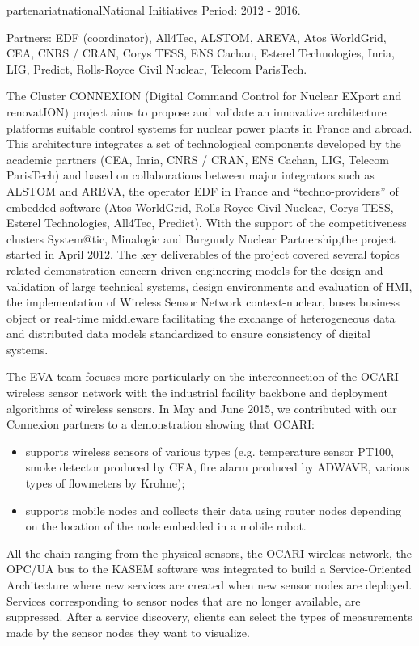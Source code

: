 \documentclass{ra2016}
\begin{document}
\begin{module}{partenariat}{national}{National Initiatives}
Period: 2012 - 2016.

Partners: EDF (coordinator), All4Tec, ALSTOM, AREVA, Atos WorldGrid, CEA, CNRS / CRAN, Corys TESS, ENS Cachan, Esterel Technologies, Inria, LIG, Predict, Rolls-Royce Civil Nuclear, Telecom ParisTech.

The Cluster CONNEXION (Digital Command Control for Nuclear EXport and renovatION) project aims to propose and validate an innovative architecture platforms suitable control systems for nuclear power plants in France and abroad. This architecture integrates a set of technological components developed by the academic partners (CEA, Inria, CNRS / CRAN, ENS Cachan, LIG, Telecom ParisTech) and based on collaborations between major integrators such as ALSTOM and AREVA, the operator EDF in France and ``techno-providers'' of embedded software (Atos WorldGrid, Rolls-Royce Civil Nuclear, Corys TESS, Esterel Technologies, All4Tec, Predict).
With the support of the competitiveness clusters System@tic, Minalogic and Burgundy Nuclear Partnership,the project started in April 2012. The key deliverables of the project covered several topics related demonstration concern-driven engineering models for the design and validation of large technical systems, design environments and evaluation of HMI, the implementation of Wireless Sensor Network context-nuclear, buses business object or real-time middleware facilitating the exchange of heterogeneous data and distributed data models standardized to ensure consistency of digital systems. 

The EVA team focuses more particularly on the interconnection of the OCARI wireless sensor network with the industrial facility backbone and deployment algorithms of wireless sensors.
In May and June 2015, we contributed with our Connexion partners to a demonstration showing that OCARI:

\begin{itemize}
    \item supports wireless sensors of various types (e.g. temperature sensor PT100, smoke detector produced by CEA, fire alarm produced by ADWAVE, various types of flowmeters by Krohne);
    \item supports mobile nodes and collects their data using router nodes depending on the location of the node embedded in a mobile robot.
\end{itemize}

All the chain ranging from the physical sensors, the OCARI wireless network, the OPC/UA bus to the KASEM software was integrated to build a Service-Oriented Architecture where new services are created when new sensor nodes are deployed. Services corresponding to sensor nodes that are no longer available, are suppressed. After a service discovery, clients can select the types of measurements made by the sensor nodes they want to visualize.


\end{module}
\end{document}
